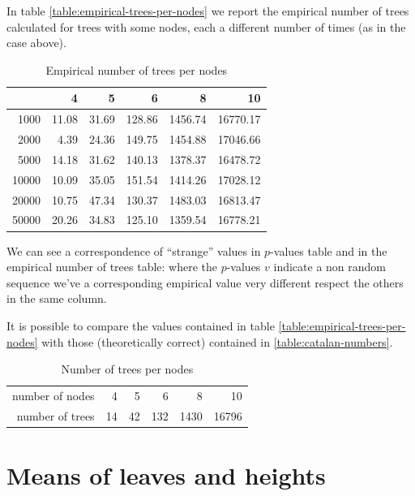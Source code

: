 In table \autoref{table:empirical-trees-per-nodes} we report the
empirical number of trees calculated for trees with some nodes, each a
different number of times (as in the case above).
\begin{table}[ht]
  \begin{center}
    \begin{tabular}{rrrrrr}
      \hline
      & 4 & 5 & 6 & 8 & 10 \\ 
      \hline
      1000 & 11.08 & 31.69 & 128.86 & 1456.74 & 16770.17 \\ 
      2000 & 4.39 & 24.36 & 149.75 & 1454.88 & 17046.66 \\ 
      5000 & 14.18 & 31.62 & 140.13 & 1378.37 & 16478.72 \\ 
      10000 & 10.09 & 35.05 & 151.54 & 1414.26 & 17028.12 \\ 
      20000 & 10.75 & 47.34 & 130.37 & 1483.03 & 16813.47 \\ 
      50000 & 20.26 & 34.83 & 125.10 & 1359.54 & 16778.21 \\ 
      \hline
    \end{tabular}
    \caption{Empirical number of trees per nodes}
    \label{table:empirical-trees-per-nodes}
  \end{center}
\end{table}
We can see a correspondence of ``strange'' values in $p$-values table
and in the empirical number of trees table: where the $p$-values $v$
indicate a non random sequence we've a corresponding empirical value
very different respect the others in the same column.

It is possible to compare the values contained in table
\autoref{table:empirical-trees-per-nodes} with those (theoretically
correct) contained in \autoref{table:catalan-numbers}.
\begin{table}[ht]
  \begin{center}
    \begin{tabular}{rrrrrr}
      \hline
      number of nodes & 4 & 5 & 6 & 8 & 10 \\ 
      number of trees & 14 & 42 & 132 & 1430 & 16796 \\ 
      \hline
    \end{tabular}
    \caption{Number of trees per nodes}
    \label{table:catalan-numbers}
  \end{center}
\end{table}

\section{Means of leaves and heights}

